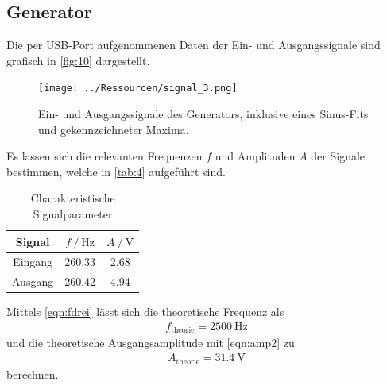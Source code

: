 \documentclass[12pt]{article}
\begin{document}
\subsection{Generator}
Die per USB-Port aufgenommenen Daten der Ein- und Ausgangssignale sind grafisch in \autoref{fig:10} dargestellt.
\begin{figure}[H]
  \centering
  \texttt{[image: ../Ressourcen/signal\_3.png]}
  \caption{Ein- und Ausgangssignale des Generators, inklusive eines Sinus-Fits und gekennzeichneter Maxima.}
  \label{fig:10}
\end{figure}
Es lassen sich die relevanten Frequenzen $f$ und Amplituden $A$ der Signale bestimmen, welche in \autoref{tab:4} aufgeführt sind.
\begin{table}[H]
  \centering
  \caption{Charakteristische Signalparameter}
  \begin{tabular}{c | c c}
  \toprule
   Signal & $f\mathbin{/}\unit{\hertz}$ & $A\mathbin{/}\unit{\volt}$\\
  \midrule
  Eingang & 260.33 & 2.68\\
  Ausgang & 260.42 & 4.94\\
  \bottomrule
  \end{tabular}
  \label{tab:4}
\end{table}
Mittels \autoref{eqn:fdrei} lässt sich die theoretische Frequenz als 
\begin{align}
  f_\text{theorie} = \SI{2500}{\hertz}
\end{align}
und die theoretische Ausgangsamplitude mit \autoref{eqn:amp2} zu
\begin{align}
  A_\text{theorie} = \SI{31.4}{\volt}
\end{align}
berechnen.
\end{document}
